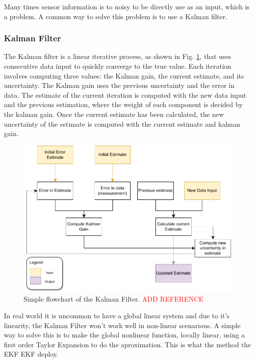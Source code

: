 


Many times sensor information is to noisy to be directly use as an input, which is a problem. A common way to solve this problem is to use a Kalman filter.

\subsubsection{Kalman Filter}
The Kalman filter is a linear iterative process, as shown in Fig. \ref*{fig: flowchart kalman}, that uses consecutive data input to quickly converge to the true value. Each iteration involves computing three values: the Kalman gain, the current estimate, and its uncertainty. The Kalman gain uses the previous uncertainty and the error in data. The estimate of the current iteration is computed with the new data input and the previous estimation, where the weight of each component is decided by the kalman gain. Once the current estimate has been calculated, the new uncertainty of the estimate is computed with the current estimate and kalman gain.

\begin{figure}[H]
    \centering
    \includegraphics[width=0.7\linewidth]{images/background/Kalman-diagram.pdf}
    \caption{Simple flowchart of the Kalman Filter. \textcolor{red}{ADD REFERENCE}}
    \label{fig: flowchart kalman}
\end{figure}


In real world it is uncommon to have a global linear system and due to it's linearity, the Kalman Filter won't work well in non-linear scenarious. A simple way to solve this is to make the global nonlinear function, locally linear, using a first order Taylor Expansion to do the aproximation. This is what the method the \acl{EKF} \acs*{EKF} deploy.


